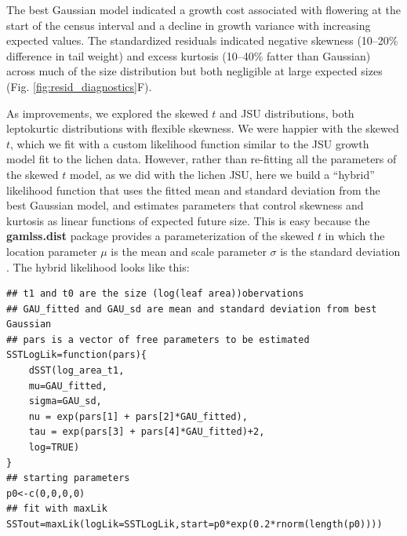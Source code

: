 \documentclass[12pt]{article}
\begin{document}
The best Gaussian model indicated a growth cost associated with flowering at the start of the census interval and a decline in growth variance with increasing expected values. 
The standardized residuals indicated negative skewness (10--20\% difference in tail weight) and excess kurtosis (10--40\% fatter than Gaussian) across much of the size distribution but both negligible at large expected sizes (Fig. \ref{fig:resid_diagnostics}F). 

As improvements, we explored the skewed $t$ and JSU distributions, both leptokurtic distributions with flexible skewness. 
We were happier with the skewed $t$, which we fit with a custom likelihood function similar to the JSU growth model fit to the lichen data. 
However, rather than re-fitting all the parameters of the skewed $t$ model, as we did with the lichen JSU, here we build a ``hybrid'' likelihood function that uses the fitted mean and standard deviation from the best Gaussian model, and estimates parameters that control skewness and kurtosis as linear functions of expected future size. 
This is easy because the \textbf{gamlss.dist} package provides a parameterization of the skewed $t$ in which the location parameter $\mu$ is the mean and scale parameter $\sigma$ is the standard deviation \citep{rigby2019distributions}. 
The hybrid likelihood looks like this:
\begin{lstlisting}
## t1 and t0 are the size (log(leaf area))obervations
## GAU_fitted and GAU_sd are mean and standard deviation from best Gaussian
## pars is a vector of free parameters to be estimated
SSTLogLik=function(pars){
	dSST(log_area_t1, 
	mu=GAU_fitted,
	sigma=GAU_sd,
	nu = exp(pars[1] + pars[2]*GAU_fitted),
	tau = exp(pars[3] + pars[4]*GAU_fitted)+2, 
	log=TRUE)
}
## starting parameters
p0<-c(0,0,0,0)
## fit with maxLik
SSTout=maxLik(logLik=SSTLogLik,start=p0*exp(0.2*rnorm(length(p0)))) 
\end{lstlisting}
\end{document}
